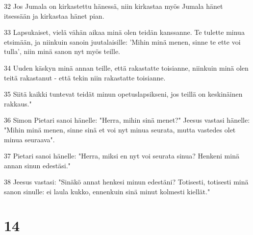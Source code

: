 \par 32 Jos Jumala on kirkastettu hänessä, niin kirkastaa myös Jumala hänet itsessään ja kirkastaa hänet pian.
\par 33 Lapsukaiset, vielä vähän aikaa minä olen teidän kanssanne. Te tulette minua etsimään, ja niinkuin sanoin juutalaisille: 'Mihin minä menen, sinne te ette voi tulla', niin minä sanon nyt myös teille.
\par 34 Uuden käskyn minä annan teille, että rakastatte toisianne, niinkuin minä olen teitä rakastanut - että tekin niin rakastatte toisianne.
\par 35 Siitä kaikki tuntevat teidät minun opetuslapsikseni, jos teillä on keskinäinen rakkaus."
\par 36 Simon Pietari sanoi hänelle: "Herra, mihin sinä menet?" Jeesus vastasi hänelle: "Mihin minä menen, sinne sinä et voi nyt minua seurata, mutta vastedes olet minua seuraava".
\par 37 Pietari sanoi hänelle: "Herra, miksi en nyt voi seurata sinua? Henkeni minä annan sinun edestäsi."
\par 38 Jeesus vastasi: "Sinäkö annat henkesi minun edestäni? Totisesti, totisesti minä sanon sinulle: ei laula kukko, ennenkuin sinä minut kolmesti kiellät."

\chapter{14}

